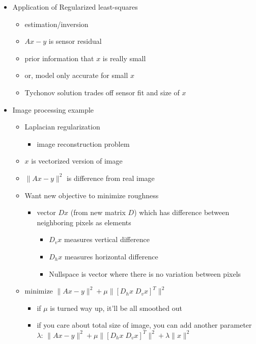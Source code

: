 \documentclass[10pt,letterpaper]{article}
\begin{document}
\begin{itemize}
\item Application of Regularized least-squares

\begin{itemize}
\item estimation/inversion
\item $Ax-y$ is sensor residual
\item prior information that $x$ is really small
\item or, model only accurate for small $x$
\item Tychonov solution trades off sensor fit and size of $x$
\end{itemize}

\item Image processing example

\begin{itemize}
\item Laplacian regularization

\begin{itemize}
\item image reconstruction problem
\end{itemize}

\item $x$ is vectorized version of image
\item $\|A x - y\| ^{2}$ is difference from real image
\item Want new objective to minimize roughness

\begin{itemize}
\item vector $Dx$ (from new matrix $D$) which has difference between neighboring pixels as elements

\begin{itemize}
\item $D_v x$ measures vertical difference
\item $D_h x$ measures horizontal difference
\item Nullspace is vector where there is no variation between pixels
\end{itemize}

\end{itemize}

\item minimize $\|A x-y\| ^{2} + \mu \| [D_h x \; D_v x]^{T} \| ^{2}$

\begin{itemize}
\item if $\mu$ is turned way up, it'll be all smoothed out
\item if you care about total size of image, you can add another parameter $\lambda$: $\|A x-y\| ^{2} + \mu \| [D_h x \; D_v x]^{T} \| ^{2} + \lambda \|x\| ^{2}$
\end{itemize}

\end{itemize}

\end{itemize}
\end{document}
